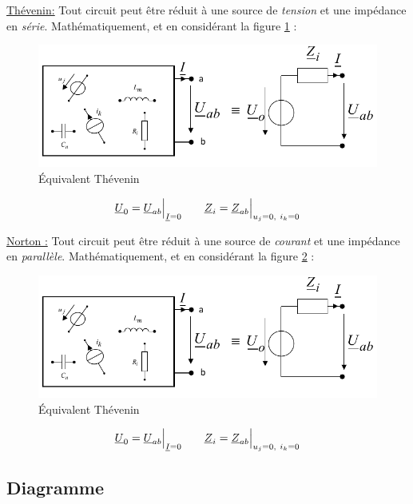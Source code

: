 \documentclass[12pt,a4paper]{article}
\newcommand{\uz}{\uline{Z} }
\newcommand{\ui}{\uline{I} }
\newcommand{\uu}{\uline{U} }
\begin{document}
\uline{Thévenin:} Tout circuit peut être réduit à une source de \textit{tension} et une impédance en \textit{série}. Mathématiquement, et en considérant la figure \ref{fig: thevenin impedance} :
\begin{figure}[!h]
	\centering
	\includegraphics[scale=0.5]{images/thevenin_impedance}
	\caption{Équivalent Thévenin}
	\label{fig: thevenin impedance}
\end{figure}

\begin{equation}
	\uu_0 = \uu_{ab}\Big|_{\ui = 0} \qquad \uz_i = \uz_{ab}\Big|_{u_j = 0,\ i_k = 0}
\end{equation}

\uline{Norton :} Tout circuit peut être réduit à une source de \textit{courant} et une impédance en \textit{parallèle}. Mathématiquement, et en considérant la figure \ref{fig: norton impedance} :
\begin{figure}[!h]
	\centering
	\includegraphics[scale=0.5]{images/thevenin_impedance}
	\caption{Équivalent Thévenin}
	\label{fig: norton impedance}
\end{figure}
\begin{equation}
	\uu_0 = \uu_{ab}\Big|_{\ui = 0} \qquad \uz_i = \uz_{ab}\Big|_{u_j = 0,\ i_k = 0}
\end{equation}


\subsection{Diagramme}
\end{document}
